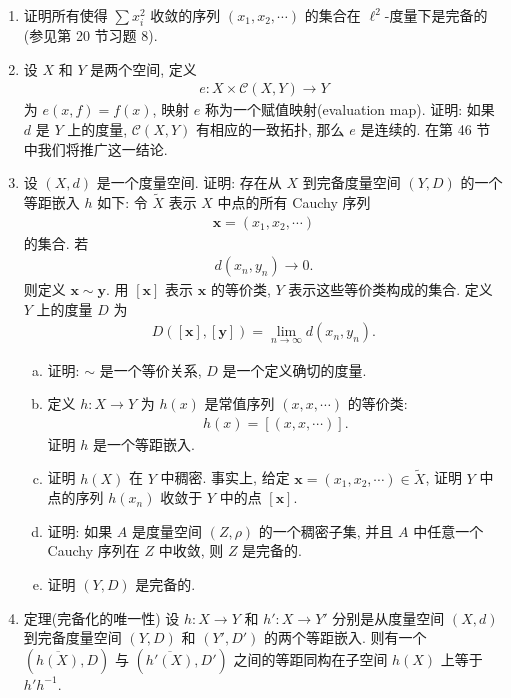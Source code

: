 \documentclass[../../main.tex]{subfiles}
\begin{document}
\begin{enumerate}
\begin{enumerate}[(a)]
\begin{align*}
\phi(x)=1/d(x,X-U).
\end{align*}
通过 $f(x)=x\times\phi(x)$ 将 $U$ 嵌入到 $X\times\mathbb{R}$ 中.]
\item 证明: 如果 $A$ 是拓扑完备空间中的一个 $G_\delta$ 集, 则 $A$ 是拓扑完备的. [提示: 设 $A$ 是开集 $U_n$ 的交, $n\in\mathbb{Z}_+$, 考虑 $A$ 到 $\prod U_n$ 的对角线嵌入 $f(a)=(a,a,\cdots)$.] 证明: 无理数集是拓扑完备的.
\end{enumerate}
\item 证明所有使得 $\sum x_i^2$ 收敛的序列 $(x_1,x_2,\cdots)$ 的集合在 $\ell^2$-度量下是完备的 (参见第 20 节习题 8).
\item 设 $X$ 和 $Y$ 是两个空间, 定义
\begin{align*}
e\colon X\times\mathcal{C}(X,Y)\longrightarrow Y
\end{align*}
为 $e(x,f)=f(x)$, 映射 $e$ 称为一个赋值映射(evaluation map). 证明: 如果 $d$ 是 $Y$ 上的度量, $\mathcal{C}(X,Y)$ 有相应的一致拓扑, 那么 $e$ 是连续的. 在第 46 节中我们将推广这一结论.
\item 设 $(X,d)$ 是一个度量空间. 证明: 存在从 $X$ 到完备度量空间 $(Y,D)$ 的一个等距嵌入 $h$ 如下: 令 $\widetilde{X}$ 表示 $X$ 中点的所有 Cauchy 序列
\begin{align*}
\mathbf{x}=(x_1,x_2,\cdots)
\end{align*}
的集合. 若
\begin{align*}
d(x_n,y_n)\longrightarrow 0.
\end{align*}
则定义 $\mathbf{x}\sim\mathbf{y}$. 用 $[\mathbf{x}]$ 表示 $\mathbf{x}$ 的等价类, $Y$ 表示这些等价类构成的集合. 定义 $Y$ 上的度量 $D$ 为
\begin{align*}
D([\mathbf{x}],[\mathbf{y}])=\lim_{n\to\infty}d(x_n,y_n).
\end{align*}
\begin{enumerate}[(a)]
\item 证明: $\sim$ 是一个等价关系, $D$ 是一个定义确切的度量.
\item 定义 $h\colon X\to Y$ 为 $h(x)$ 是常值序列 $(x,x,\cdots)$ 的等价类:
\begin{align*}
h(x)=[(x,x,\cdots)].
\end{align*}
证明 $h$ 是一个等距嵌入.
\item 证明 $h(X)$ 在 $Y$ 中稠密. 事实上, 给定 $\mathbf{x}=(x_1,x_2,\cdots)\in\widetilde{X}$, 证明 $Y$ 中点的序列 $h(x_n)$ 收敛于 $Y$ 中的点 $[\mathbf{x}]$.
\item 证明: 如果 $A$ 是度量空间 $(Z,\rho)$ 的一个稠密子集, 并且 $A$ 中任意一个 Cauchy 序列在 $Z$ 中收敛, 则 $Z$ 是完备的.
\item 证明 $(Y,D)$ 是完备的.
\end{enumerate}
\item 定理(完备化的唯一性) 设 $h\colon X\to Y$ 和 $h'\colon X\to Y'$ 分别是从度量空间 $(X,d)$ 到完备度量空间 $(Y,D)$ 和 $(Y',D')$ 的两个等距嵌入. 则有一个 $(\overline{h(X)},D)$ 与 $(\overline{h'(X)},D')$ 之间的等距同构在子空间 $h(X)$ 上等于 $h'h^{-1}$.
\end{enumerate}
\end{document}
